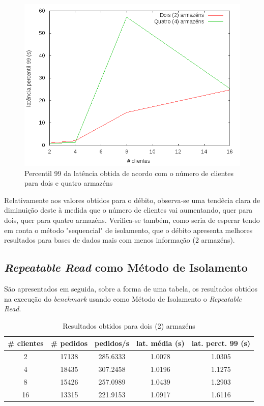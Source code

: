 
\begin{figure}[!h]
\centering
\includegraphics[scale=.4]{img/questao-1/ser-lat-pct99}
\caption{Percentil 99 da latência obtida de acordo com o número de clientes para dois e quatro armazéns}
\end{figure}

\newpage

Relativamente aos valores obtidos para o débito, observa-se uma tendêcia clara de diminuição deste à medida que o número de clientes vai aumentando, quer para dois, quer para quatro armazéns.
Verifica-se também, como seria de esperar tendo em conta o método "sequencial" de isolamento, que o débito apresenta melhores resultados para bases de dados mais com menos informação (2 armazéns).



\subsection{\textit{Repeatable Read} como Método de Isolamento}

São apresentados em seguida, sobre a forma de uma tabela, os resultados obtidos na execução do \textit{benchmark} usando como Método de Isolamento o \textit{Repeatable Read}.

\begin{table}[!h]
\center
\small
\begin{tabular}{|c|c|c|c|c|}
\hline
\textbf{\# clientes} & \textbf{\# pedidos} & \textbf{pedidos/s} & \textbf{lat. média (s)} & \textbf{lat. perct. 99 (s)}  \\ \hline
2 & 17138 & 285.6333 & 1.0078 & 1.0305  \\ \hline
4 & 18435 & 307.2458 & 1.0196 & 1.1275  \\ \hline
8 & 15426 & 257.0989 & 1.0439 & 1.2903  \\ \hline
16 & 13315 & 221.9153 & 1.0917 & 1.6116  \\ \hline
\end{tabular}
\caption{Resultados obtidos para dois (2) armazéns}
\end{table}

